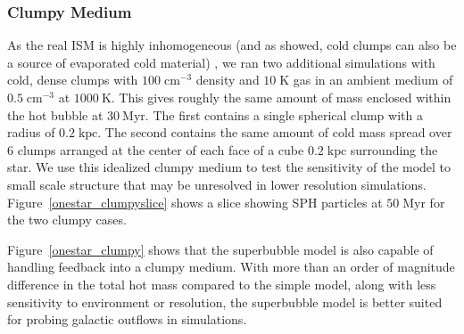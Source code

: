 \subsubsection{Clumpy Medium}\label{clumpy}
As the real ISM is highly inhomogeneous (and as \citet{Silich1996} showed, cold
clumps can also be a source of evaporated cold material) , we ran two additional
simulations with cold, dense clumps with $100\;\mathrm{cm^{-3}}$ density and
$10\;\mathrm{K}$ gas in an ambient medium of $0.5\;\mathrm{cm^{-3}}$ at
$1000\:\mathrm{K}$.  This gives roughly the same amount of mass enclosed within
the hot bubble at $30\:\mathrm{Myr}$.  The first contains a single spherical
clump with a radius of $0.2\;\mathrm{kpc}$.  The second contains the same amount
of cold mass spread over 6 clumps arranged at the center of each face of a cube
$0.2\;\mathrm{kpc}$ surrounding the star.  We use this idealized clumpy medium
to test the sensitivity of the model to small scale structure that may be
unresolved in lower resolution simulations. Figure~\ref{onestar_clumpyslice}
shows a slice showing SPH particles at $50\;\mathrm{Myr}$ for the two clumpy
cases.  

Figure~\ref{onestar_clumpy} shows that the superbubble model is also capable of
handling feedback into a clumpy medium.  With more than an order of magnitude
difference in the total hot mass compared to the simple model, along with less
sensitivity to environment or resolution, the superbubble model is better
suited for probing galactic outflows in simulations.  


